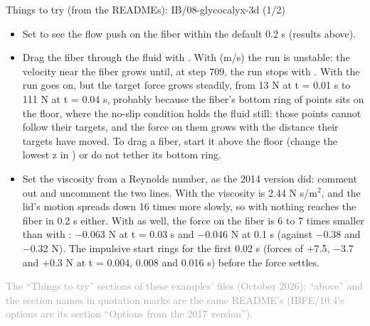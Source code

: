 \documentclass[aspectratio=169,11pt]{beamer}
\newcommand{\sourcecredit}[1]{\vfill\begin{flushright}\tiny\textcolor{DarkGray}{#1}\end{flushright}}
\begin{document}
\begin{frame}{Things to try (from the READMEs): IB/08-glycocalyx-3d (1/2)}
\scriptsize\setlength{\leftmargini}{5em}
\begin{itemize}\setlength{\itemsep}{1pt}
  \item[IB/08.1] Set  to see the flow push on the fiber within the default 0.2 s (results above).
  \item[IB/08.2] Drag the fiber through the fluid with . With  (m/s) the run is unstable: the velocity near the fiber grows until, at step 709, the run stops with . With  the run goes on, but the target force grows steadily, from 13 N at t = 0.01 s to 111 N at t = 0.04 s, probably because the fiber's bottom ring of points sits on the floor, where the no-slip condition holds the fluid still: those points cannot follow their targets, and the force on them grows with the distance their targets have moved. To drag a fiber, start it above the floor (change the lowest z in ) or do not tether its bottom ring.
  \item[IB/08.3] Set the viscosity from a Reynolds number, as the 2014 version did: comment out  and uncomment the two  lines. With  the viscosity is 2.44 N s/m$^{2}$, and the lid's motion spreads down 16 times more slowly, so with  nothing reaches the fiber in 0.2 s either. With  as well, the force on the fiber is 6 to 7 times smaller than with : $-$0.063 N at t = 0.03 s and $-$0.046 N at 0.1 s (against $-$0.38 and $-$0.32 N). The impulsive start rings for the first 0.02 s (forces of +7.5, $-$3.7 and +0.3 N at t = 0.004, 0.008 and 0.016 s) before the force settles.
\end{itemize}
\sourcecredit{The ``Things to try'' sections of these examples' \code{README.md} files (October 2026); ``above'' and the section names in quotation marks are the same README's (IBFE/10.4's options are its section ``Options from the 2017 version'').}
\end{frame}
\end{document}
